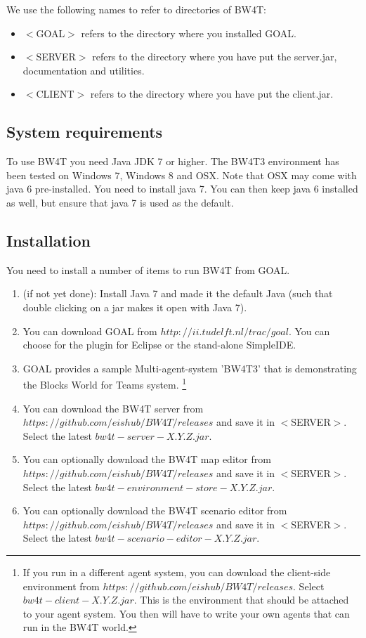 \documentclass[11pt,a4paper]{article}
\begin{document}
We use the following names to refer to directories of BW4T:
\begin{itemize}
\item $<$GOAL$>$ refers to the directory where you installed GOAL.
\item $<$SERVER$>$ refers to the directory where you have put the server.jar, documentation and utilities.
\item $<$CLIENT$>$ refers to the directory where you have put the client.jar.
\end{itemize}

\subsection{System requirements}
To use BW4T you need Java JDK 7 or higher. The BW4T3 environment has been tested on Windows 7, Windows 8 and OSX. Note that OSX may come with java 6 pre-installed. You need to install java 7. You can then keep java 6 installed as well, but ensure that java 7 is used as the default.

\subsection{Installation}
You need to install a number of items to run BW4T from GOAL. 
\begin{enumerate}
 \item (if not yet done): Install Java 7 and made it the default Java (such that double clicking on a jar makes it open with Java 7).
 \item You can download GOAL from $http://ii.tudelft.nl/trac/goal$. You can choose for the plugin for Eclipse or the stand-alone SimpleIDE.
 \item GOAL provides a sample Multi-agent-system 'BW4T3' that is demonstrating the Blocks World for Teams system. \footnote{If you run in a different agent system, you can download the client-side environment from $https://github.com/eishub/BW4T/releases$. Select $bw4t-client-X.Y.Z.jar$. This is the environment that should be attached to your agent system. You then will have to write your own agents that can run in the BW4T world.}
 \item You can download the BW4T server from $https://github.com/eishub/BW4T/releases$ and save it in $<$SERVER$>$. Select the latest $bw4t-server-X.Y.Z.jar$.
 \item You can optionally download the BW4T map editor from $https://github.com/eishub/BW4T/releases$ and save it in $<$SERVER$>$. Select the latest $bw4t-environment-store-X.Y.Z.jar$.
 \item You can optionally download the BW4T scenario editor from $https://github.com/eishub/BW4T/releases$ and save it in $<$SERVER$>$. Select the latest $bw4t-scenario-editor-X.Y.Z.jar$.
\end{enumerate}
  
\end{document}
